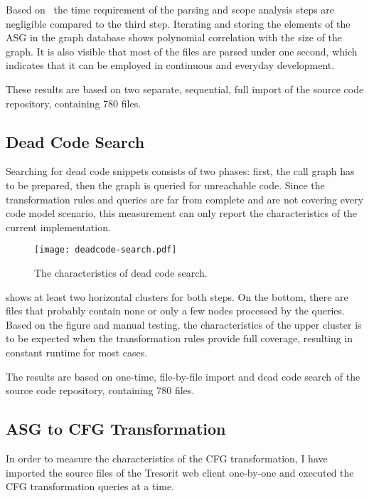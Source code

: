 Based on~ the time requirement of the parsing and scope analysis steps are negligible compared to the third step. Iterating and storing the elements of the ASG in the graph database shows polynomial correlation with the size of the graph. It is also visible that most of the files are parsed under one second, which indicates that it can be employed in continuous and everyday development.

These results are based on two separate, sequential, full import of the source code repository, containing 780 files.


\subsection{Dead Code Search}
Searching for dead code snippets consists of two phases: first, the call graph has to be prepared, then the graph is queried for unreachable code. Since the transformation rules and queries are far from complete and are not covering every code model scenario, this measurement can only report the characteristics of the current implementation.

\begin{figure}[!htb]
  \centering
  \texttt{[image: deadcode-search.pdf]}
  \caption{The characteristics of dead code search.}
  \label{fig:deadcode-search}
\end{figure}

 shows at least two horizontal clusters for both steps. On the bottom, there are files that probably contain none or only a few nodes processed by the queries. Based on the figure and manual testing, the characteristics of the upper cluster is to be expected when the transformation rules provide full coverage, resulting in constant runtime for most cases.

The results are based on one-time, file-by-file import and dead code search of the source code repository, containing 780 files.

\subsection{ASG to CFG Transformation}
In order to measure the characteristics of the CFG transformation, I have imported the source files of the Tresorit web client one-by-one and executed the CFG transformation queries at a time.

